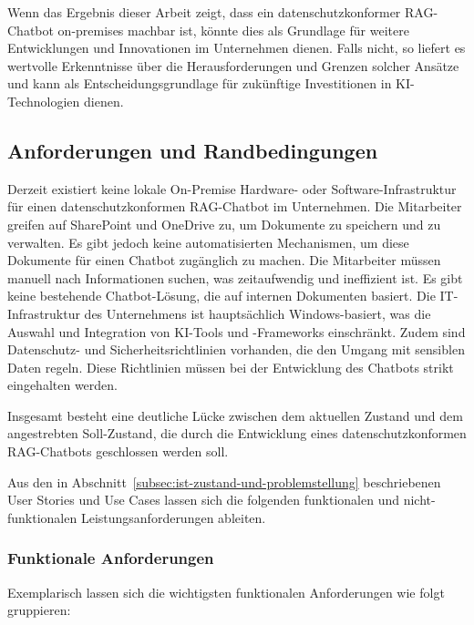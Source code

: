 Wenn das Ergebnis dieser Arbeit zeigt, dass ein datenschutzkonformer RAG-Chatbot on-premises machbar ist, könnte dies als Grundlage für weitere Entwicklungen und Innovationen im Unternehmen dienen.
Falls nicht, so liefert es wertvolle Erkenntnisse über die Herausforderungen und Grenzen solcher Ansätze und kann als Entscheidungsgrundlage für zukünftige Investitionen in KI-Technologien dienen.

\subsection{Anforderungen und Randbedingungen}\label{subsec:anforderungen}

Derzeit existiert keine lokale On-Premise Hardware- oder Software-Infrastruktur für einen datenschutzkonformen RAG-Chatbot im Unternehmen.
Die Mitarbeiter greifen auf SharePoint und OneDrive zu, um Dokumente zu speichern und zu verwalten.
Es gibt jedoch keine automatisierten Mechanismen, um diese Dokumente für einen Chatbot zugänglich zu machen.
Die Mitarbeiter müssen manuell nach Informationen suchen, was zeitaufwendig und ineffizient ist.
Es gibt keine bestehende Chatbot-Lösung, die auf internen Dokumenten basiert.
Die IT-Infrastruktur des Unternehmens ist hauptsächlich Windows-basiert, was die Auswahl und Integration von KI-Tools und -Frameworks einschränkt.
Zudem sind Datenschutz- und Sicherheitsrichtlinien vorhanden, die den Umgang mit sensiblen Daten regeln.
Diese Richtlinien müssen bei der Entwicklung des Chatbots strikt eingehalten werden.

Insgesamt besteht eine deutliche Lücke zwischen dem aktuellen Zustand und dem angestrebten Soll-Zustand, die durch die Entwicklung eines datenschutzkonformen RAG-Chatbots geschlossen werden soll.

Aus den in Abschnitt~\ref{subsec:ist-zustand-und-problemstellung} beschriebenen User Stories und Use Cases lassen sich die folgenden funktionalen und nicht-funktionalen Leistungsanforderungen ableiten.

\subsubsection{Funktionale Anforderungen}

Exemplarisch lassen sich die wichtigsten funktionalen Anforderungen wie folgt gruppieren:

